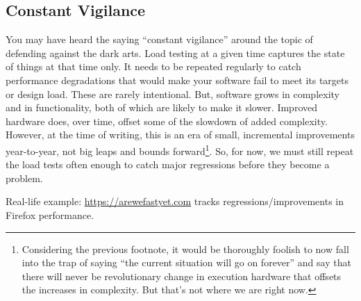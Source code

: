 \subsection*{Constant Vigilance}
You may have heard the saying ``constant vigilance'' around the topic of defending against the dark arts. Load testing at a given time captures the state of things at that time only. It needs to be repeated regularly to catch performance degradations that would make your software fail to meet its targets or design load. These are rarely intentional. But, software grows in complexity and in functionality, both of which are likely to make it slower. Improved hardware does, over time, offset some of the slowdown of added complexity. However, at the time of writing, this is an era of small, incremental improvements year-to-year, not big leaps and bounds forward\footnote{Considering the previous footnote, it would be thoroughly foolish to now fall into the trap of saying ``the current situation will go on forever'' and say that there will never be revolutionary change in execution hardware that offsets the increases in complexity. But that's not where we are right now.}. So, for now, we must still repeat the load tests often enough to catch major regressions before they become a problem.

Real-life example: \url{https://arewefastyet.com} tracks regressions/improvements in Firefox performance.




